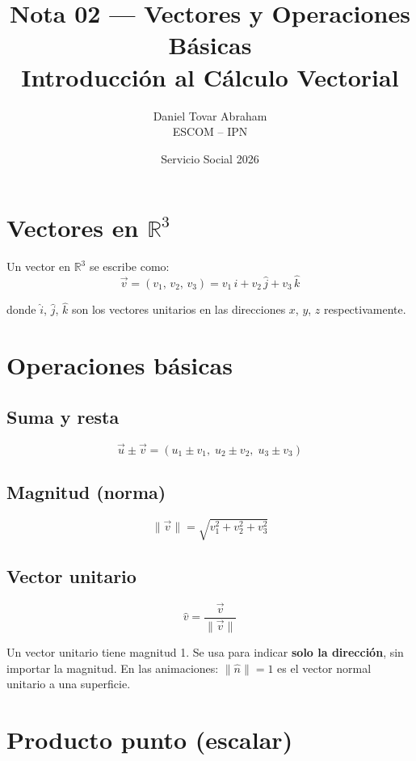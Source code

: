 \documentclass[12pt]{article}
\title{\textcolor{azulIPn}{\textbf{Nota 02 — Vectores y Operaciones Básicas}} \\
       \large Introducción al Cálculo Vectorial}
\author{Daniel Tovar Abraham \\ ESCOM -- IPN}
\date{Servicio Social 2026}
\begin{document}
\maketitle

\section{Vectores en $\mathbb{R}^3$}

Un vector en $\mathbb{R}^3$ se escribe como:
\[
  \vec{v} = (v_1,\, v_2,\, v_3) = v_1\,\hat{i} + v_2\,\hat{j} + v_3\,\hat{k}
\]

donde $\hat{i}$, $\hat{j}$, $\hat{k}$ son los vectores unitarios en las 
direcciones $x$, $y$, $z$ respectivamente.

\section{Operaciones básicas}

\subsection{Suma y resta}
\[
  \vec{u} \pm \vec{v} = (u_1 \pm v_1,\; u_2 \pm v_2,\; u_3 \pm v_3)
\]

\subsection{Magnitud (norma)}
\[
  \|\vec{v}\| = \sqrt{v_1^2 + v_2^2 + v_3^2}
\]

\subsection{Vector unitario}
\[
  \hat{v} = \frac{\vec{v}}{\|\vec{v}\|}
\]

\begin{nota}
  Un vector unitario tiene magnitud 1. Se usa para indicar 
  \textbf{solo la dirección}, sin importar la magnitud.
  En las animaciones: $\|\hat{n}\| = 1$ es el vector normal unitario 
  a una superficie.
\end{nota}

\section{Producto punto (escalar)}
\end{document}
